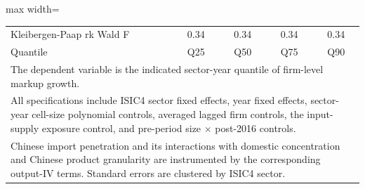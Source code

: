\begin{table}[htbp]
\begin{adjustbox}{max width=\textwidth}
\begin{tabular}{l*{4}{c}}
Kleibergen-Paap rk Wald F&     0.34         &     0.34         &     0.34         &     0.34         \\
Quantile        &      Q25         &      Q50         &      Q75         &      Q90         \\
\bottomrule
\multicolumn{5}{l}{\footnotesize The dependent variable is the indicated sector-year quantile of firm-level markup growth.}\\
\multicolumn{5}{l}{\footnotesize All specifications include ISIC4 sector fixed effects, year fixed effects, sector-year cell-size polynomial controls, averaged lagged firm controls, the input-supply exposure control, and pre-period size $\times$ post-2016 controls.}\\
\multicolumn{5}{l}{\footnotesize Chinese import penetration and its interactions with domestic concentration and Chinese product granularity are instrumented by the corresponding output-IV terms. Standard errors are clustered by ISIC4 sector.}\\
\end{tabular}
\end{adjustbox}
\end{table}
